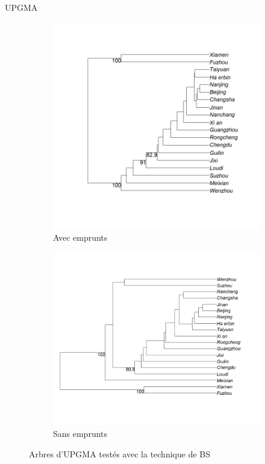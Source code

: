 \documentclass[11pt]{beamer}
\begin{document}
\begin{frame}{UPGMA}
\begin{figure}[htbp]
\flushleft
\begin{subfigure}{.4\textwidth}
\centering
\includegraphics[scale=.2]{Figure/UPGMA_BS_with}
\caption{Avec emprunts}
\end{subfigure}
\begin{subfigure}{.4\textwidth}
\centering
\includegraphics[scale=.2]{Figure/UPGMA_BS_without}
\caption{Sans emprunts}
\end{subfigure}
\caption{Arbres d'UPGMA testés avec la technique de BS}
\label{Fig:UPGMA_BS}
\end{figure}
\end{frame}
\end{document}
